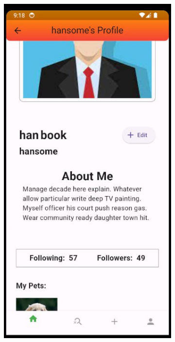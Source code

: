 \begin{figure}[H]
\begin{subfigure}{0.32\textwidth}
    \label{subfig:1}
  \end{subfigure}%
  \hfill
  \begin{subfigure}{0.32\textwidth}
    \includegraphics[width=\linewidth]{img/profile.jpg}

\end{subfigure}
\end{figure}
